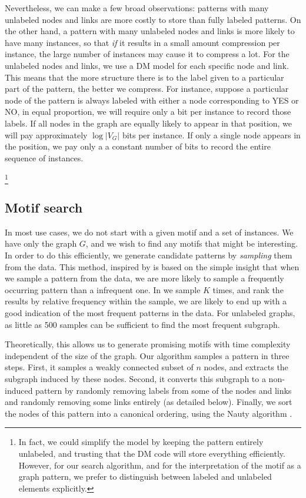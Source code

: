 \documentclass[11pt]{article}
\begin{document}
Nevertheless, we can make a few broad observations: patterns with many unlabeled nodes and links are more costly to store than fully labeled patterns. On the other hand, a pattern with many unlabeled nodes and links is more likely to have many instances, so that \emph{if} it results in a small amount compression per instance, the large number of instances may cause it to compress a lot. For the unlabeled nodes and links, we use a DM model for each specific node and link. This means that the more structure there is to the label given to a particular part of the pattern, the better we compress. For instance, suppose a particular node of the pattern is always labeled with either a node corresponding to YES or NO, in equal proportion, we will require only a bit per instance to record those labels. If all nodes in the graph are equally likely to appear in that position, we will pay approximately $\log |V_G|$ bits per instance. If only a single node appears in the position, we pay only a a constant number of bits to record the entire sequence of instances. \footnotemark

\footnote{In fact, we could simplify the model by keeping the pattern entirely unlabeled, and trusting that the DM code will store everything efficiently. However, for our search algorithm, and for the interpretation of the motif as a graph pattern, we prefer to distinguish between labeled and unlabeled elements explicitly.}

\subsection{Motif search}

\label{section:search}

In most use cases, we do not start with a given motif and a set of instances. We have only the graph $G$, and we wish to find any motifs that might be interesting. In order to do this efficiently, we generate candidate patterns by \emph{sampling} them from the data. This method, inspired by \cite{kashtan2004efficient} is based on the simple insight that when we sample a pattern from the data, we are more likely to sample a frequently occurring pattern than a infrequent one. In we sample $K$ times, and rank the results by relative frequency within the sample, we are likely to end up with a good indication of the most frequent patterns in the data. For unlabeled graphs, as little as 500 samples can be sufficient to find the most frequent subgraph.

Theoretically, this allows us to generate promising motifs with time complexity independent of the size of the graph. Our algorithm samples a pattern in three steps. First, it samples a weakly connected subset of $n$ nodes, and extracts the subgraph induced by these nodes. Second, it converts this subgraph to a non-induced pattern by randomly removing labels from some of the nodes and links and randomly removing some links entirely (as detailed below). Finally, we sort the nodes of this pattern into a canonical ordering, using the Nauty algorithm \cite{mckay1981practical}. 
\end{document}
